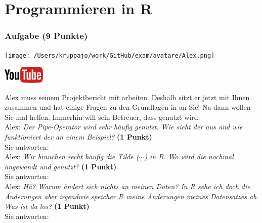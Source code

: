 \documentclass[a4paper, 9pt]{scrartcl}\usepackage[]{graphicx}\usepackage[]{xcolor}
\begin{document}
\part{Programmieren in R}

\section{Aufgabe \hfill (9 Punkte)}



 
\begin{minipage}[t]{0.5\textwidth}
\texttt{[image: /Users/kruppajo/work/GitHub/exam/avatare/Alex.png]}
\end{minipage}
\begin{minipage}[t]{0.5\textwidth}
\hfill
\href{https://www.youtube.com/playlist?list=PLe51bCp9JvEFUnFqaJG5aRmON9i1ZbOYC}{\includegraphics[width = 2cm]{img/youtube}}
\end{minipage}
\vspace{1ex}



Alex muss seinem Projektbericht mit \Rlogo arbeiten. Deshalb sitzt er jetzt mit Ihnen zusammen und hat einige Fragen zu den Grundlagen in \Rlogo an Sie! Na dann wollen Sie mal helfen. Immerhin will sein Betreuer, dass \Rlogo genutzt wird.\\[1Ex]

Alex: \textit{Der Pipe-Operator wird sehr häufig genutzt. Wie sieht der aus und wie funktioniert der an einem Beispiel?} \textbf{(1 Punkt)}\\[1ex]
Sie antworten:\\[2Ex]

Alex: \textit{Wir brauchen recht häufig die Tilde ($\sim$) in R. Wo wird die nochmal angewandt und genutzt?} \textbf{(1 Punkt)}\\[1ex]
Sie antworten:\\[2Ex]

Alex: \textit{Hä? Warum ändert sich nichts an meinen Daten? In R sehe ich doch die Änderungen aber irgendwie speicher R meine Änderungen meines Datensatzes ab. Was ist da los?} \textbf{(1 Punkt)}\\[1ex]
Sie antworten:\\[2Ex]
\end{document}
